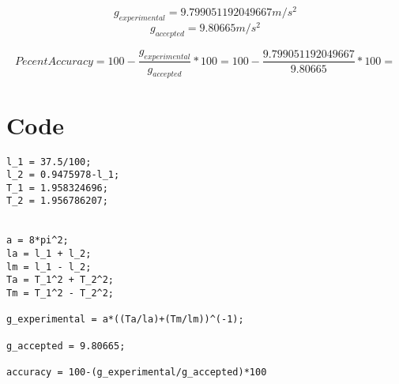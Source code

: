 \documentclass[12pt, oneside]{article}   	%
\begin{document}
\begin{equation}
g_{experimental} = 9.799051192049667 m/s^2
\end{equation}
\begin{equation}
g_{accepted} = 9.80665 m/s^2
\end{equation}

\begin{equation}
Pecent Accuracy = 100-\frac{g_{experimental}}{g_{accepted}}*100=100-\frac{9.799051192049667}{9.80665}*100=
\end{equation}

\section{Code}

\begin{lstlisting}
l_1 = 37.5/100;
l_2 = 0.9475978-l_1;
T_1 = 1.958324696;
T_2 = 1.956786207;


a = 8*pi^2;
la = l_1 + l_2;
lm = l_1 - l_2;
Ta = T_1^2 + T_2^2;
Tm = T_1^2 - T_2^2;

g_experimental = a*((Ta/la)+(Tm/lm))^(-1);

g_accepted = 9.80665;

accuracy = 100-(g_experimental/g_accepted)*100
\end{lstlisting}
\end{document}

